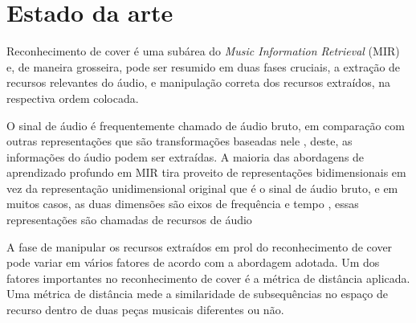 \chapter{Estado da arte}

Reconhecimento de cover é uma subárea do \textit{Music Information Retrieval} (MIR) e, de maneira grosseira, pode ser resumido em duas fases cruciais, a extração de recursos relevantes do áudio, e manipulação correta dos recursos extraídos, na respectiva ordem colocada. 

O sinal de áudio é frequentemente chamado de áudio bruto, em comparação com outras representações que são transformações baseadas nele \cite{Choi2018}, deste, as informações do áudio podem ser extraídas. A maioria das abordagens de aprendizado profundo em MIR tira proveito de representações bidimensionais em vez da representação unidimensional original que é o sinal de áudio bruto, e em muitos casos, as duas dimensões são eixos de frequência e tempo \cite{Choi2018}, essas representações são chamadas de recursos de áudio

A fase de manipular os recursos extraídos em prol do reconhecimento de cover pode variar em vários fatores de acordo com a abordagem adotada. Um dos fatores importantes no reconhecimento de cover é a métrica de distância aplicada. Uma métrica de distância mede a similaridade de subsequências no espaço de recurso dentro de duas peças musicais \cite{Chang2017} diferentes ou não. 

